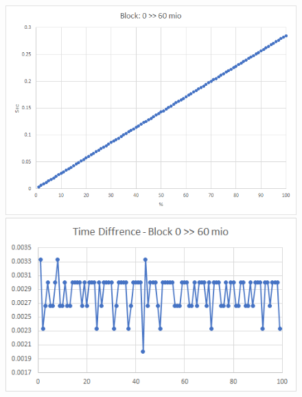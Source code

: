 \documentclass{TUBAFarbeiten}
\begin{document}
\begin{figure}[H]
\label{fig:Block0-60}
\includegraphics[scale=0.9]{Block0-60}
\begin{center}
\includegraphics[scale=1]{Block0-60-Time}
\end{center}
\end{figure}
\end{document}
